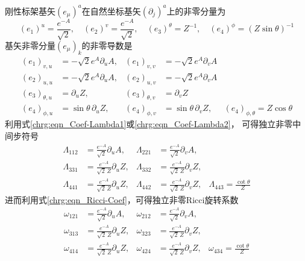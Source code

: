 刚性标架基矢$(e_\mu)^{a}$在自然坐标基矢$(\partial _j)^{a}$上的非零分量为
\begin{equation}
  (e_1)^{u}=\frac{e^{-A}}{\sqrt{2}}, \quad
  (e_2)^{v}=\frac{e^{-A}}{\sqrt{2}}, \quad
  (e_3)^{\theta}=Z^{-1}, \quad
  (e_4)^{\phi}=(Z\sin\theta)^{-1}
\end{equation}
基矢非零分量$(e_\mu)_{k}$的非零导数是
\begin{equation}
\begin{aligned}
  (e_1)_{v,u}&=-\sqrt{2}e^A \partial_u A,  & (e_1)_{v,v}&=-\sqrt{2}e^A \partial_v A  \\
  (e_2)_{u,u}&=-\sqrt{2} e^A \partial_u A, & (e_2)_{u,v}&=-\sqrt{2} e^A \partial_v A  \\
  (e_3)_{\theta,u}&= \partial_u Z, & (e_3)_{\theta,v}&= \partial_v Z \\
  (e_4)_{\phi,u}&= \sin\theta \, \partial_u Z, &
  (e_4)_{\phi,v}&= \sin\theta \, \partial_v Z, &
  (e_4)_{\phi,\theta}=Z \cos\theta
\end{aligned}
\end{equation}
利用式\eqref{chrg:eqn_Coef-Lambda1}或\eqref{chrg:eqn_Coef-Lambda2}，
可得独立非零中间步符号
\begin{equation}
\begin{aligned}
  \Lambda_{112}&= \frac{e^{-A}}{\sqrt{2}} \partial_u A, &
  \Lambda_{221}&= \frac{e^{-A}}{\sqrt{2}} \partial_v A, \\
  \Lambda_{331}&= \frac{e^{-A}}{\sqrt{2}\, Z} \partial_u Z, &
  \Lambda_{332}&= \frac{e^{-A}}{\sqrt{2}\, Z} \partial_v Z, \\
  \Lambda_{441}&= \frac{e^{-A}}{\sqrt{2}\, Z} \partial_u Z, &
  \Lambda_{442}&= \frac{e^{-A}}{\sqrt{2}\, Z} \partial_v Z, &
  \Lambda_{443} = \frac{\cot\theta}{Z}
\end{aligned}
\end{equation}
进而利用式\eqref{chrg:eqn_Ricci-Coef}，可得独立非零Ricci旋转系数
\begin{equation}
\begin{aligned}
  \omega_{121} &= \frac{e^{-A}}{\sqrt{2}}  \partial_u A, &
  \omega_{212} &= \frac{e^{-A}}{\sqrt{2}}  \partial_v A, \\
  \omega_{313} &= \frac{e^{-A}}{\sqrt{2}\, Z}  \partial_u Z, &
  \omega_{323} &= \frac{e^{-A}}{\sqrt{2}\, Z}  \partial_v Z, \\
  \omega_{414} &= \frac{e^{-A}}{\sqrt{2}\, Z}  \partial_u Z, &
  \omega_{424} &= \frac{e^{-A}}{\sqrt{2}\, Z}  \partial_v Z, &
  \omega_{434}  = \frac{\cot\theta}{Z}
\end{aligned}
\end{equation}

